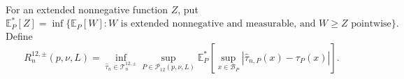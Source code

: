For an extended nonnegative function \(Z\), put
\[
 \mathbb E_P^*[Z]=\inf\{\mathbb E_P[W]:W\text{ is extended nonnegative and measurable, and }W\geq Z\text{ pointwise}\}.
\]
Define
\[
 R^{12,\pm}_n(p,\nu,L)=
 \inf_{\widehat\tau_n\in\mathcal T^{12,\pm}_n}
 \sup_{P\in\mathcal P_{12}(p,\nu,L)}
 \mathbb E_P^*\!\left[
 \sup_{x\in\mathcal B_P}|\widehat\tau_{n,P}(x)-\tau_P(x)|
 \right].
\]